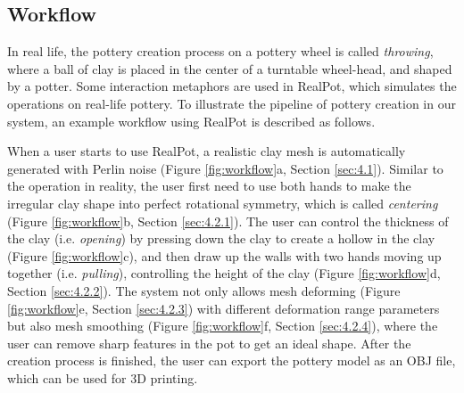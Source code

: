 \documentclass{svjour3}                     %
\begin{document}
\subsection{Workflow}
\label{sec:3.2}
In real life, the pottery creation process on a pottery wheel is called \textit{throwing}, where a ball of clay is placed in the center of a turntable wheel-head, and shaped by a potter.
Some interaction metaphors are used in RealPot, which simulates the operations on real-life pottery.
To illustrate the pipeline of pottery creation in our system, an example workflow using RealPot is described as follows.

When a user starts to use RealPot, a realistic clay mesh is automatically generated with Perlin noise (Figure \ref{fig:workflow}a, Section \ref{sec:4.1}). 
Similar to the operation in reality, the user first need to use both hands to make the irregular clay shape into perfect rotational symmetry, which is called \textit{centering} (Figure \ref{fig:workflow}b, Section \ref{sec:4.2.1}).
The user can control the thickness of the clay (i.e. \textit{opening}) by pressing down the clay to create a hollow in the clay (Figure \ref{fig:workflow}c), 
and then draw up the walls with two hands moving up together (i.e. \textit{pulling}), controlling the height of the clay (Figure \ref{fig:workflow}d, Section \ref{sec:4.2.2}).
The system not only allows mesh deforming (Figure \ref{fig:workflow}e, Section \ref{sec:4.2.3}) with different deformation range parameters but also mesh smoothing (Figure \ref{fig:workflow}f, Section \ref{sec:4.2.4}), where the user can remove sharp features in the pot to get an ideal shape.
After the creation process is finished, the user can export the pottery model as an OBJ file, which can be used for 3D printing.
\end{document}
